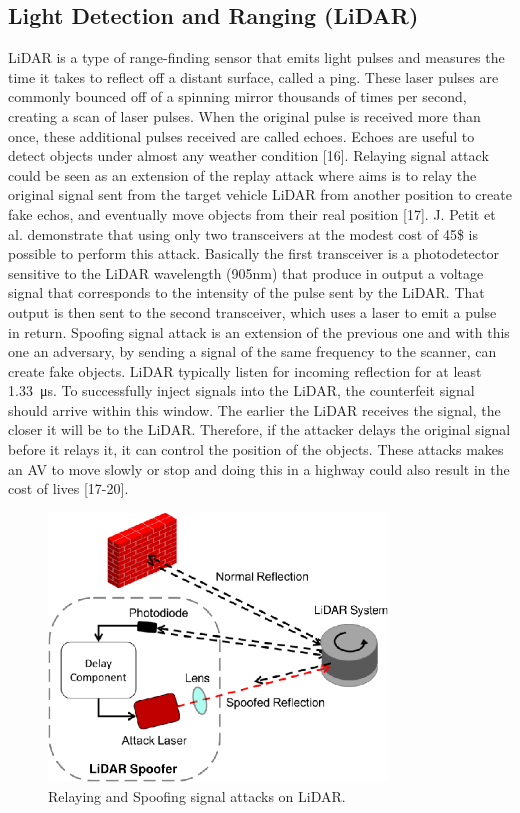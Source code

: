 \subsection{Light Detection and Ranging (LiDAR)}
    LiDAR is a type of range-finding sensor that emits light pulses and measures the time it takes to reflect off a distant surface, called a ping. These laser pulses are commonly bounced off of a spinning mirror thousands of times per second, creating a scan of laser pulses. When the original pulse is received more than once, these additional pulses received are called echoes. Echoes are useful to detect objects under almost any weather condition [16].
    \newline
    Relaying signal attack could be seen as an extension of the replay attack where aims is to relay the original signal sent from the target vehicle LiDAR from another position to create fake echos, and eventually move objects from their real position [17]. J. Petit et al. demonstrate that using only two transceivers at the modest cost of 45\$ is possible to perform this attack. Basically the first transceiver is a photodetector sensitive to the LiDAR wavelength (905nm) that produce in output a voltage signal that corresponds to the intensity of the pulse sent by the LiDAR. That output is then sent to the second transceiver, which uses a laser to emit a pulse in return.
    \newline
    Spoofing signal attack is an extension of the previous one and with this one an adversary, by sending a signal of the same frequency to the scanner, can create fake objects. LiDAR typically listen for incoming reflection for at least \SI{1.33}{\micro\second}. To successfully inject signals into the LiDAR, the counterfeit signal should arrive within this window. The earlier the LiDAR receives the signal, the closer it will be to the LiDAR.
    Therefore, if the attacker delays the original signal before it relays it, it can control the position of the objects.
    \newline
    These attacks makes an AV to move slowly or stop and doing this in a highway could also result in the cost of lives [17-20].
    \newline
    \begin{figure}
        \includegraphics[width=9cm]{./files/lidarspoof.png}
        \caption{Relaying and Spoofing signal attacks on LiDAR.}
    \end{figure}
